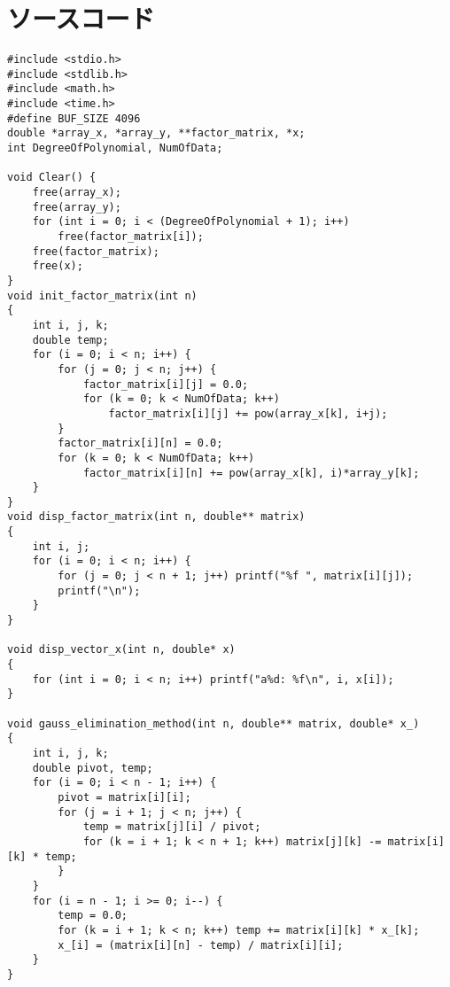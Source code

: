 \appendix
\def\thesection{補遺\Alph{section}}
\section{ソースコード}
\begin{lstlisting}[caption=lsm\_polynomial.c,label=lsm]
#include <stdio.h>
#include <stdlib.h>
#include <math.h>
#include <time.h>
#define BUF_SIZE 4096
double *array_x, *array_y, **factor_matrix, *x;
int DegreeOfPolynomial, NumOfData;

void Clear() {
    free(array_x);
    free(array_y);
    for (int i = 0; i < (DegreeOfPolynomial + 1); i++)
        free(factor_matrix[i]);
    free(factor_matrix);
    free(x);
}
void init_factor_matrix(int n)
{
    int i, j, k;
    double temp;
    for (i = 0; i < n; i++) {
        for (j = 0; j < n; j++) {
            factor_matrix[i][j] = 0.0;
            for (k = 0; k < NumOfData; k++)
                factor_matrix[i][j] += pow(array_x[k], i+j);
        }
        factor_matrix[i][n] = 0.0;
        for (k = 0; k < NumOfData; k++)
            factor_matrix[i][n] += pow(array_x[k], i)*array_y[k];
    }
}
void disp_factor_matrix(int n, double** matrix)
{
    int i, j;
    for (i = 0; i < n; i++) {
        for (j = 0; j < n + 1; j++) printf("%f ", matrix[i][j]);
        printf("\n"); 
    }
}

void disp_vector_x(int n, double* x)
{
    for (int i = 0; i < n; i++) printf("a%d: %f\n", i, x[i]);
}

void gauss_elimination_method(int n, double** matrix, double* x_)
{
    int i, j, k;
    double pivot, temp;
    for (i = 0; i < n - 1; i++) {
        pivot = matrix[i][i];
        for (j = i + 1; j < n; j++) {
            temp = matrix[j][i] / pivot;
            for (k = i + 1; k < n + 1; k++) matrix[j][k] -= matrix[i][k] * temp;
        }
    }
    for (i = n - 1; i >= 0; i--) {
        temp = 0.0;
        for (k = i + 1; k < n; k++) temp += matrix[i][k] * x_[k];
        x_[i] = (matrix[i][n] - temp) / matrix[i][i];
    }
}


\end{lstlisting}
